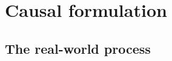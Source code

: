 
% 

\section{Causal formulation} \label{sec:causal-formulation}

\subsection{The real-world process}

